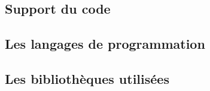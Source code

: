 
\subsection{Support du code}
	

\subsection{Les langages de programmation}
	
	
\subsection{Les bibliothèques utilisées}
	
